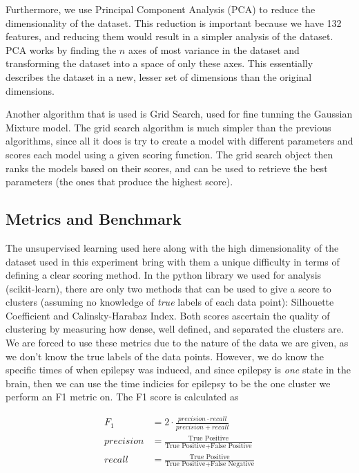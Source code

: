 \documentclass[journal,12pt,onecolumn,draftclsnofoot]{IEEEtran}  %
\begin{document}
Furthermore, we use Principal Component Analysis (PCA) to reduce the dimensionality of the dataset. This reduction is important because we have 132 features, and reducing them would result in a simpler analysis of the dataset. PCA works by finding the $n$ axes of most variance in the dataset and transforming the dataset into a space of only these axes. This essentially describes the dataset in a new, lesser set of dimensions than the original dimensions.

Another algorithm that is used is Grid Search, used for fine tunning the Gaussian Mixture model. The grid search algorithm is much simpler than the previous algorithms, since all it does is try to create a model with different parameters and scores each model using a given scoring function. The grid search object then ranks the models based on their scores, and can be used to retrieve the best parameters (the ones that produce the highest score).

\subsection{Metrics and Benchmark}
The unsupervised learning used here along with the high dimensionality of the dataset used in this experiment bring with them a unique difficulty in terms of defining a clear scoring method. In the python library we used for analysis (scikit-learn), there are only two methods that can be used to give a score to clusters (assuming no knowledge of \textit{true} labels of each data point): Silhouette Coefficient and Calinsky-Harabaz Index. Both scores ascertain the quality of clustering by measuring how dense, well defined, and separated the clusters are. We are forced to use these metrics due to the nature of the data we are given, as we don't know the true labels of the data points. However, we do know the specific times of when epilepsy was induced, and since epilepsy is \textit{one} state in the brain, then we can use the time indicies for epilepsy to be the one cluster we perform an F1 metric on. The F1 score is calculated as 

\begin{align*}
  F_1 &= 2 \cdot \frac{precision \cdot recall}{precision + recall} \\
  precision &= \frac{\text{True Positive}}{\text{True Positive} + \text{False Positive}} \\
  recall &= \frac{\text{True Positive}}{\text{True Positive} + \text{False Negative}}
\end{align*}
\end{document}
